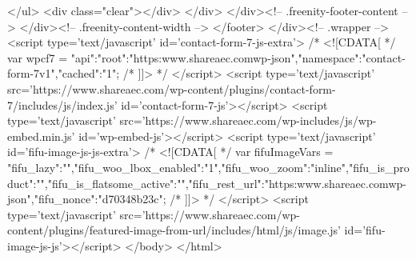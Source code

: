 			</ul>
	<div class="clear"></div>
			</div>
		</div><!-- .freenity-footer-content -->
	</div><!-- .freenity-content-width -->
</footer>
</div><!-- .wrapper -->
<script type='text/javascript' id='contact-form-7-js-extra'>
/* <![CDATA[ */
var wpcf7 = {"api":{"root":"https:\/\/www.shareaec.com\/wp-json\/","namespace":"contact-form-7\/v1"},"cached":"1"};
/* ]]> */
</script>
<script type='text/javascript' src='https://www.shareaec.com/wp-content/plugins/contact-form-7/includes/js/index.js' id='contact-form-7-js'></script>
<script type='text/javascript' src='https://www.shareaec.com/wp-includes/js/wp-embed.min.js' id='wp-embed-js'></script>
<script type='text/javascript' id='fifu-image-js-js-extra'>
/* <![CDATA[ */
var fifuImageVars = {"fifu_lazy":"","fifu_woo_lbox_enabled":"1","fifu_woo_zoom":"inline","fifu_is_product":"","fifu_is_flatsome_active":"","fifu_rest_url":"https:\/\/www.shareaec.com\/wp-json\/","fifu_nonce":"d70348b23c"};
/* ]]> */
</script>
<script type='text/javascript' src='https://www.shareaec.com/wp-content/plugins/featured-image-from-url/includes/html/js/image.js' id='fifu-image-js-js'></script>
</body>
</html>
